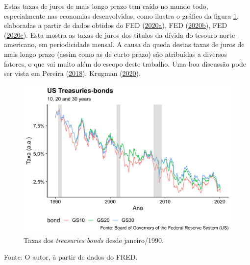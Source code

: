\documentclass[
	12pt,				%
	oneside,			%
	a4paper,			%
	chapter=TITLE,		%
	section=TITLE,		%
	english,			%
	brazil				%
	]{abntex2}
\newcommand{\bcenter}{\begin{center}}
\newcommand{\ecenter}{\end{center}}
\DeclareRobustCommand{\firstsecond}[2]{#1}
\begin{document}
Estas taxas de juros de mais longo prazo tem caído no mundo todo, especialmente
nas economias desenvolvidas, como ilustra o gráfico da figura \ref{fig:yields},
elaboradas a partir de dados obtidos do \firstsecond{\gls{FED}}{Board of Governors of the Federal Reserve System (US)} (\protect\hyperlink{ref-fredgs10}{2020}\protect\hyperlink{ref-fredgs10}{a}), \firstsecond{\gls{FED}}{Board of Governors of the Federal Reserve System (US)} (\protect\hyperlink{ref-fredgs20}{2020}\protect\hyperlink{ref-fredgs20}{b}), \firstsecond{\gls{FED}}{Board of Governors of the Federal Reserve System (US)} (\protect\hyperlink{ref-fredgs30}{2020}\protect\hyperlink{ref-fredgs30}{c}). Esta
mostra as taxas de juros dos títulos da dívida do tesouro norte-americano,
em periodicidade mensal. A causa da queda destas taxas de juros de mais longo
prazo (assim como as de curto prazo) são atribuídas a diversos fatores, o que
vai muito além do escopo deste trabalho. Uma boa discussão pode ser vista em
Pereira (\protect\hyperlink{ref-bresser2018}{2018}), Krugman (\protect\hyperlink{ref-krugman2020}{2020}).
\begin{figure}[H]

{\centering \includegraphics[width=0.7\linewidth]{images/yields-1} 

}

\caption{Taxas dos \emph{treasuries bonds} desde janeiro/1990.}\label{fig:yields}
\end{figure}
\bcenter

Fonte: O autor, à partir de dados do \gls{FRED}.
\ecenter
\end{document}
